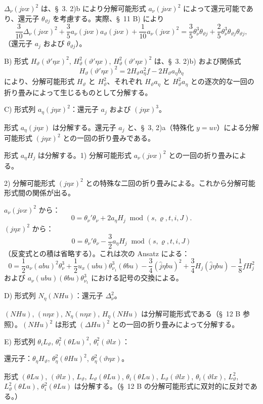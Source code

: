 \documentclass[11pt]{jlreq}
\newcommand{\A}{\Delta}
\newcommand{\R}{\varrho}
\newcommand{\modu}[1]{\;\operatorname{mod} #1}
\begin{document}
$\A_\nu(j\nu x)^2$ は、\S\ 3. 2)b により分解可能形式 $a_\nu(j\nu x)^2$ によって還元可能であり、還元子 $\theta_{\vartheta j}$ を考慮する。実際、\S\ 11 B) により
\[
\frac3{10}\A_\nu(j\nu x)^2+\frac35a_\nu(j\nu x)a_\vartheta(j\nu x)
+\frac1{10}a_\nu(j\nu x)^2
=\frac35\theta_\nu^3\theta_{\vartheta j}+\frac25\theta_\nu^3\theta_{\vartheta j}\theta_{\vartheta j},
\]
（還元子 $a_j$ および $\theta_{\vartheta j}$）。

\noindent B) 形式 $H_\vartheta(\vartheta'\eta x)^2$, $H_\vartheta^2(\vartheta'\eta x)$, $H_\vartheta^2(\vartheta'\eta x)^2$ は、\S\ 3. 2)b) および関係式
\[
H_\vartheta(\vartheta'\eta x)^2=2H_\vartheta a_\eta^2f-2H_\vartheta a_\eta b_\eta
\]
により、分解可能形式 $H_\vartheta$ と $H_\vartheta^2$、それぞれ $H_\vartheta a_\eta$ と $H_\vartheta^2a_\eta$ との逐次的な一回の折り畳みによって生じるものとして分解する。

\noindent C) 形式列 $a_\eta(j\eta x)^2$：還元子 $a_j$ および $(j\eta x)^3$。

形式 $a_\eta(j\eta x)$ は分解する。還元子 $a_j$ と、\S\ 3, 2)a（特殊化 $y=uv$）による分解可能形式 $(j\eta x)^2$ との一回の折り畳みである。

形式 $a_\eta H_j$ は分解する。1) 分解可能形式 $a_\nu(j\nu x)^2$ との一回の折り畳みによる。

2) 分解可能形式 $(j\eta x)^2$ との特殊な二回の折り畳みによる。これから分解可能形式間の関係が出る。

$a_\nu(j\nu x)^2$ から：
\[
0=\theta_\nu'\theta_\nu+2a_\eta H_j\modu{(s,\R,t,i,J)}.
\]
$(j\eta x)^2$ から：
\[
0=\theta_\nu'\theta_\nu-\frac32a_\eta H_j\modu{(s,\R,t,i,J)}
\]
（反変式との積は省略する）。これは次の Ansatz による：
\[
0=\frac12a_\nu(abu)^2\theta_\nu^3
+\frac12u_x(ubu)\theta_{\nu_1}^3(\theta bu)
-\frac34(\widehat{j}\eta bu)^2+\frac34H_j(\widehat{j}\eta bu)
-\frac18fH_j^2
\]
および $a_\nu(ubu)(\theta bu)\theta_{\nu_1}^3$ における記号の交換による。

\noindent D) 形式列 $N_\eta(NHu)$：還元子 $\A_\nu^2$。

$(NHu)$, $(n\eta x)$, $N_\eta(n\eta x)$, $H_\eta(NHu)$ は分解可能形式である（\S\ 12 B 参照）。$(NHu)^2$ は形式 $(\A Hu)^2$ との一回の折り畳みによって分解する。

\noindent E) 形式列 $\theta_iL_\vartheta$, $\theta_i^2(\theta Lu)^2$, $\theta_i^2(\vartheta lx)$：

還元子：$\theta_\eta H_\vartheta$, $\theta_\eta^2(\theta Hu)^2$, $\theta_\eta^2(\vartheta\eta x)$。

形式 $(\theta Lu)$, $(\vartheta lx)$, $L_\vartheta$, $L_\vartheta(\theta Lu)$, $\theta_i(\theta Lu)$, $L_\vartheta(\vartheta lx)$, $\theta_i(\vartheta lx)$, $L_\vartheta^2$, $L_\vartheta^2(\theta Lu)$, $\theta_i^2(\theta Lu)$ は分解する。（\S\ 12 B の分解可能形式に双対的に反対である。）
\end{document}
